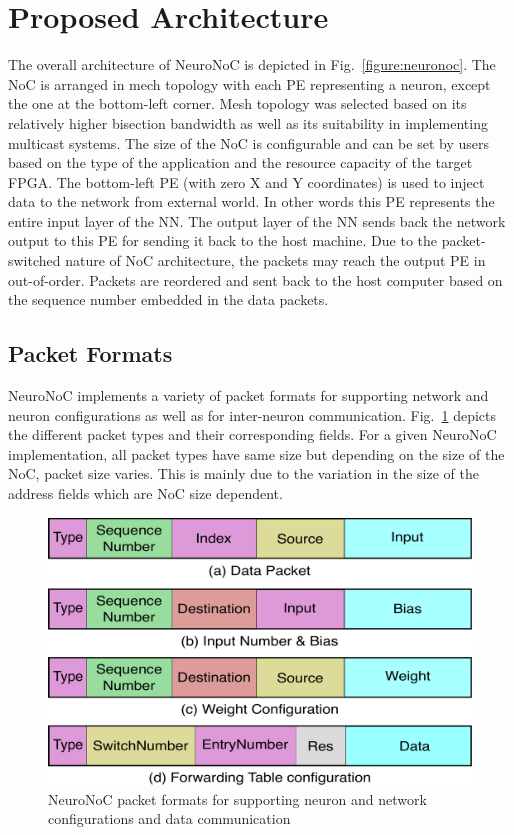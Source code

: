 \section{Proposed Architecture}

The overall architecture of NeuroNoC is depicted in Fig.~\ref{figure:neuronoc}.
The NoC is arranged in mech topology with each PE representing a neuron, except the one at the bottom-left corner.
Mesh topology was selected based on its relatively higher bisection bandwidth as well as its suitability in implementing multicast systems. 
The size of the NoC is configurable and can be set by users based on the type of the application and the resource capacity of the target FPGA.
The bottom-left PE (with zero X and Y coordinates) is used to inject data to the network from external world.
In other words this PE represents the entire input layer of the NN.
The output layer of the NN sends back the network output to this PE for sending it back to the host machine.
Due to the packet-switched nature of NoC architecture, the packets may reach the output PE in out-of-order.
Packets are reordered and sent back to the host computer based on the sequence number embedded in the data packets.

\subsection{Packet Formats}
\label{subsecpktformat}
NeuroNoC implements a variety of packet formats for supporting network and neuron configurations as well as for inter-neuron communication.  
Fig.~\ref{figure:pktformat} depicts the different packet types and their corresponding fields.
For a given NeuroNoC implementation, all packet types have same size but depending on the size of the NoC, packet size varies.
This is mainly due to the variation in the size of the address fields which are NoC size dependent. 
\begin{figure}[t!]
	\begin{center}
    \includegraphics[width=0.8\columnwidth]{Figures/pktformat.pdf}
    \caption{NeuroNoC packet formats for supporting neuron and network configurations and data communication} 
    \label{figure:pktformat}
    \end{center}
\end{figure}

